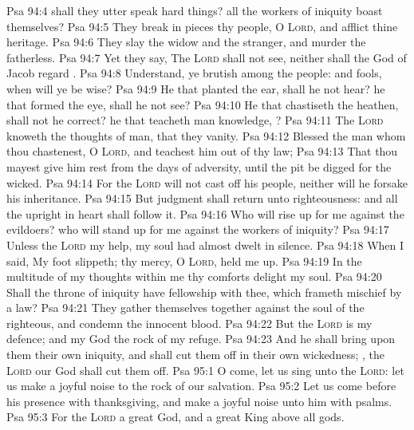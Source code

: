 \vs Psa 94:4  shall they utter  speak hard things?  all the workers of iniquity boast themselves?
\vs Psa 94:5 They break in pieces thy people, O \textsc{Lord}, and afflict thine heritage.
\vs Psa 94:6 They slay the widow and the stranger, and murder the fatherless.
\vs Psa 94:7 Yet they say, The \textsc{Lord} shall not see, neither shall the God of Jacob regard .
\vs Psa 94:8 Understand, ye brutish among the people: and  fools, when will ye be wise?
\vs Psa 94:9 He that planted the ear, shall he not hear? he that formed the eye, shall he not see?
\vs Psa 94:10 He that chastiseth the heathen, shall not he correct? he that teacheth man knowledge, ?
\vs Psa 94:11 The \textsc{Lord} knoweth the thoughts of man, that they  vanity.
\vs Psa 94:12 Blessed  the man whom thou chastenest, O \textsc{Lord}, and teachest him out of thy law;
\vs Psa 94:13 That thou mayest give him rest from the days of adversity, until the pit be digged for the wicked.
\vs Psa 94:14 For the \textsc{Lord} will not cast off his people, neither will he forsake his inheritance.
\vs Psa 94:15 But judgment shall return unto righteousness: and all the upright in heart shall follow it.
\vs Psa 94:16 Who will rise up for me against the evildoers?  who will stand up for me against the workers of iniquity?
\vs Psa 94:17 Unless the \textsc{Lord}  my help, my soul had almost dwelt in silence.
\vs Psa 94:18 When I said, My foot slippeth; thy mercy, O \textsc{Lord}, held me up.
\vs Psa 94:19 In the multitude of my thoughts within me thy comforts delight my soul.
\vs Psa 94:20 Shall the throne of iniquity have fellowship with thee, which frameth mischief by a law?
\vs Psa 94:21 They gather themselves together against the soul of the righteous, and condemn the innocent blood.
\vs Psa 94:22 But the \textsc{Lord} is my defence; and my God  the rock of my refuge.
\vs Psa 94:23 And he shall bring upon them their own iniquity, and shall cut them off in their own wickedness; , the \textsc{Lord} our God shall cut them off.
\vs Psa 95:1 O come, let us sing unto the \textsc{Lord}: let us make a joyful noise to the rock of our salvation.
\vs Psa 95:2 Let us come before his presence with thanksgiving, and make a joyful noise unto him with psalms.
\vs Psa 95:3 For the \textsc{Lord}  a great God, and a great King above all gods.

